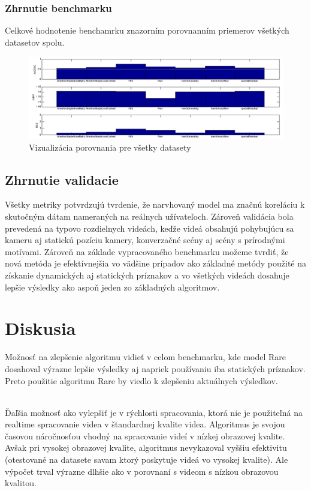 \subsubsection{Zhrnutie benchmarku}
Celkové hodnotenie benchamrku znazorním porovnanním priemerov všetkých datasetov spolu.

\begin{figure}[H]
  \includegraphics[width=15cm]{pics/benchmark.png}
  \caption{Vizualizácia porovnania pre všetky datasety}
\end{figure}

\subsection{Zhrnutie validacie}
Všetky metriky potvrdzujú tvrdenie, že narvhovaný model ma značnú koreláciu k skutočným dátam nameraných na reálnych užívateľoch.
Zároveň validácia bola prevedená na typovo rozdielnych videách, keďže videá obsahujú pohybujúcu sa kameru aj statickú pozíciu kamery, konverzačné scény aj scény s prírodnými motívami.
Zároveň na základe vypracovaného benchmarku možeme tvrdiť, že nová metóda je efektívnejšia vo vädšine prípadov ako základné metódy použité na získanie dynamických aj statických príznakov a vo všetkých videách dosahuje lepšie výsledky ako aspoň jeden zo základných algoritmov.

\section{Diskusia}
\label{ssec:diskusia}
Možnosť na zlepšenie algoritmu vidieť v celom benchmarku, kde model Rare\cite{rare-1} dosahoval výrazne lepšie výsledky aj napriek používaniu iba statických príznakov.
Preto použitie algoritmu Rare\cite{rare-1} by viedlo k zlepšeniu aktuálnych výsledkov.

\\

Ďaľšia možnosť ako vylepšiť je v rýchlosti spracovania, ktorá nie je použiteľná na realtime spracovanie videa v štandardnej kvalite videa.
Algoritmus je svojou časovou náročnosťou vhodný na spracovanie videí v nízkej obrazovej kvalite.
Avšak pri vysokej obrazovej kvalite, algoritmus nevykazoval vyššiu efektivitu (otestované na datasete savam\cite{savam} ktorý poskytuje videá vo vysokej kvalite).
Ale výpočet trval výrazne dlhšie ako v porovnaní s videom s nízkou obrazovou kvalitou.

